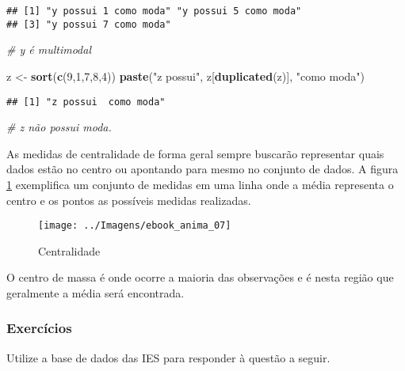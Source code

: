 \documentclass[11pt,]{style/krantz}
\makeatletter
\newenvironment{Shaded}{\begin{snugshade}}{\end{snugshade}}
\newcommand{\CommentTok}[1]{\textcolor[rgb]{0.56,0.35,0.01}{\textit{#1}}}
\newcommand{\DecValTok}[1]{\textcolor[rgb]{0.00,0.00,0.81}{#1}}
\newcommand{\KeywordTok}[1]{\textcolor[rgb]{0.13,0.29,0.53}{\textbf{#1}}}
\newcommand{\NormalTok}[1]{#1}
\newcommand{\StringTok}[1]{\textcolor[rgb]{0.31,0.60,0.02}{#1}}
\newenvironment{kframe}{%
\medskip{}
\setlength{\fboxsep}{.8em}
 \def\at@end@of@kframe{}%
 \ifinner\ifhmode%
  \def\at@end@of@kframe{\end{minipage}}%
  \begin{minipage}{\columnwidth}%
 \fi\fi%
 \def\FrameCommand##1{\hskip\@totalleftmargin \hskip-\fboxsep
 \colorbox{shadecolor}{##1}\hskip-\fboxsep
     \hskip-\linewidth \hskip-\@totalleftmargin \hskip\columnwidth}%
 \MakeFramed {\advance\hsize-\width
   \@totalleftmargin\z@ \linewidth\hsize
   \@setminipage}}%
 {\par\unskip\endMakeFramed%
 \at@end@of@kframe}
\renewenvironment{Shaded}{\begin{kframe}}{\end{kframe}}
\theoremstyle{definition}
\theoremstyle{definition}
\theoremstyle{definition}
\theoremstyle{remark}
\makeatother
\begin{document}
\begin{verbatim}
## [1] "y possui 1 como moda" "y possui 5 como moda"
## [3] "y possui 7 como moda"
\end{verbatim}

\begin{Shaded}
\begin{Highlighting}[]
\CommentTok{# y é multimodal}

\NormalTok{z <-}\StringTok{ }\KeywordTok{sort}\NormalTok{(}\KeywordTok{c}\NormalTok{(}\DecValTok{9}\NormalTok{,}\DecValTok{1}\NormalTok{,}\DecValTok{7}\NormalTok{,}\DecValTok{8}\NormalTok{,}\DecValTok{4}\NormalTok{))}
\KeywordTok{paste}\NormalTok{(}\StringTok{"z possui"}\NormalTok{, z[}\KeywordTok{duplicated}\NormalTok{(z)], }\StringTok{"como moda"}\NormalTok{)}
\end{Highlighting}
\end{Shaded}

\begin{verbatim}
## [1] "z possui  como moda"
\end{verbatim}

\begin{Shaded}
\begin{Highlighting}[]
\CommentTok{# z não possui moda.}
\end{Highlighting}
\end{Shaded}

As medidas de centralidade de forma geral sempre buscarão representar quais dados estão no centro ou apontando para mesmo no conjunto de dados.
A figura \ref{fig:fig08} exemplifica um conjunto de medidas em uma linha onde a média representa o centro e os pontos as possíveis medidas realizadas.

\begin{figure}[H]

{\centering \texttt{[image: ../Imagens/ebook\_anima\_07]}

}

\caption{Centralidade}\label{fig:fig08}
\end{figure}

O centro de massa é onde ocorre a maioria das observações e é nesta região que geralmente a média será encontrada.

\hypertarget{exercicios-1}{%
\subsubsection{Exercícios}\label{exercicios-1}}

Utilize a base de dados das IES para responder à questão a seguir.
\end{document}
